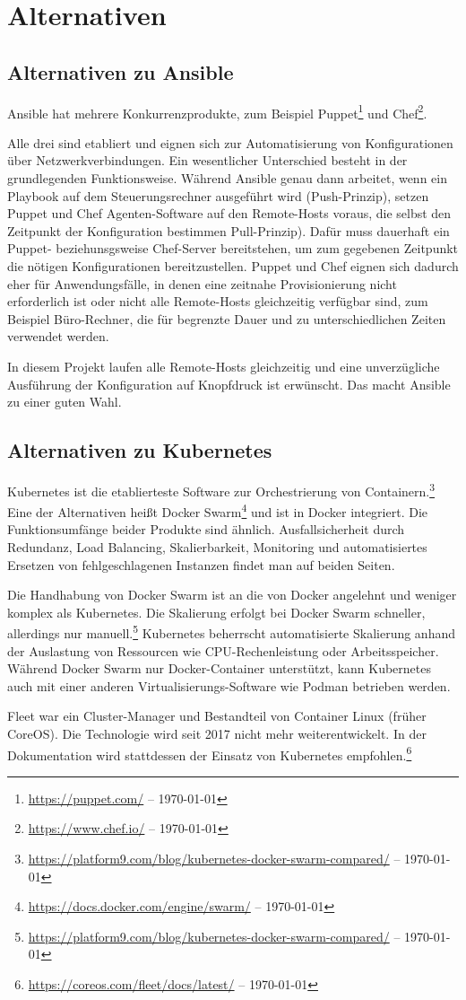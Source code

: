 \chapter{Alternativen}\label{ch:alternativen}
\section{Alternativen zu Ansible}\label{sec:ansible-alternativen}

Ansible hat mehrere Konkurrenzprodukte, zum Beispiel Puppet\footnote{\url{https://puppet.com/} -- \today} und Chef\footnote{\url{https://www.chef.io/} -- \today}.

Alle drei sind etabliert und eignen sich zur Automatisierung von Konfigurationen über Netzwerkverbindungen.
Ein wesentlicher Unterschied besteht in der grundlegenden Funktionsweise.
Während Ansible genau dann arbeitet, wenn ein Playbook auf dem Steuerungsrechner ausgeführt wird (Push-Prinzip), setzen Puppet und Chef Agenten-Software auf den Remote-Hosts voraus, die selbst den Zeitpunkt der Konfiguration bestimmen Pull-Prinzip).
Dafür muss dauerhaft ein Puppet- beziehunsgsweise Chef-Server bereitstehen, um zum gegebenen Zeitpunkt die nötigen Konfigurationen bereitzustellen.
Puppet und Chef eignen sich dadurch eher für Anwendungsfälle, in denen eine zeitnahe Provisionierung nicht erforderlich ist oder nicht alle Remote-Hosts gleichzeitig verfügbar sind, zum Beispiel Büro-Rechner, die für begrenzte Dauer und zu unterschiedlichen Zeiten verwendet werden.

In diesem Projekt laufen alle Remote-Hosts gleichzeitig und eine unverzügliche Ausführung der Konfiguration auf Knopfdruck ist erwünscht.
Das macht Ansible zu einer guten Wahl.

\section{Alternativen zu Kubernetes}\label{sec:kubernetes-alternativen}
Kubernetes ist die etablierteste Software zur Orchestrierung von Containern.\footnote{\url{https://platform9.com/blog/kubernetes-docker-swarm-compared/} -- \today}
Eine der Alternativen heißt Docker Swarm\footnote{\url{https://docs.docker.com/engine/swarm/} -- \today} und ist in Docker integriert.
Die Funktionsumfänge beider Produkte sind ähnlich.
Ausfallsicherheit durch Redundanz, Load Balancing, Skalierbarkeit, Monitoring und automatisiertes Ersetzen von fehlgeschlagenen Instanzen findet man auf beiden Seiten.

Die Handhabung von Docker Swarm ist an die von Docker angelehnt und weniger komplex als Kubernetes.
Die Skalierung erfolgt bei Docker Swarm schneller, allerdings nur manuell.\footnote{\url{https://platform9.com/blog/kubernetes-docker-swarm-compared/} -- \today}
Kubernetes beherrscht automatisierte Skalierung anhand der Auslastung von Ressourcen wie CPU-Rechenleistung oder Arbeitsspeicher.
Während Docker Swarm nur Docker-Container unterstützt, kann Kubernetes auch mit einer anderen Virtualisierungs-Software wie Podman betrieben werden.

Fleet war ein Cluster-Manager und Bestandteil von Container Linux (früher CoreOS).
Die Technologie wird seit 2017 nicht mehr weiterentwickelt.
In der Dokumentation wird stattdessen der Einsatz von Kubernetes empfohlen.\footnote{\url{https://coreos.com/fleet/docs/latest/} -- \today}
